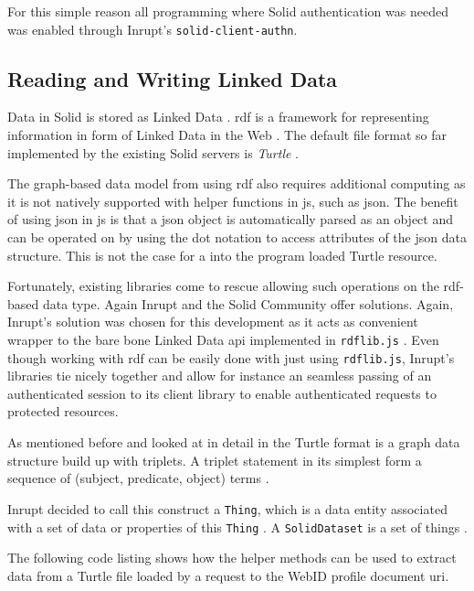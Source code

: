 For this simple reason all programming where Solid authentication was needed was enabled through Inrupt's \texttt{solid-client-authn}.

\subsection{Reading and Writing Linked Data}

Data in Solid is stored as Linked Data \cite{Malhotra:15:LDP}. \gls{rdf} is a framework for representing information in form of Linked Data in the Web \cite{Cyganiak:14:RCA}. The default file format so far implemented by the existing Solid servers is \textit{Turtle} \cite{Prud:hommeaux:14:RT}.

The graph-based data model from using \gls{rdf} also requires additional computing as it is not natively supported with helper functions in \gls{js}, such as \gls{json}. The benefit of using \gls{json} in \gls{js} is that a \gls{json} object is automatically parsed as an object and can be operated on by using the dot notation to access attributes of the \gls{json} data structure. This is not the case for a into the program loaded Turtle resource.

Fortunately, existing libraries come to rescue allowing such operations on the \gls{rdf}-based data type. Again Inrupt and the Solid Community offer solutions. Again, Inrupt's solution was chosen for this development as it acts as convenient wrapper to the bare bone Linked Data \gls{api} implemented in \texttt{rdflib.js} \cite{rdflib-js}. Even though working with \gls{rdf} can be easily done with just using \texttt{rdflib.js}, Inrupt's libraries tie nicely together and allow for instance an seamless passing of an authenticated session to its client library to enable authenticated requests to protected resources.

As mentioned before and looked at in detail in \cite{cern-solid-investigation-spec} the Turtle format is a graph data structure build up with triplets. A triplet statement in its simplest form a sequence of (subject, predicate, object) terms \cite{Prud:hommeaux:14:RT}. 

Inrupt decided to call this construct a \texttt{Thing}, which is a data entity associated with a set of data or properties of this \texttt{Thing} \cite{thing}. A \texttt{SolidDataset} is a set of things \cite{inrupt-dataset}.

The following code listing shows how the helper methods can be used to extract data from a Turtle file loaded by a request to the WebID profile document \gls{uri}.

